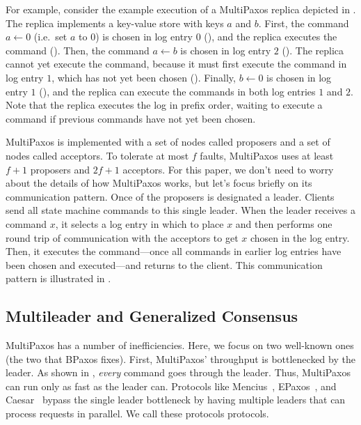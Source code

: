 For example, consider the example execution of a MultiPaxos replica depicted in
. The replica implements a key-value store
with keys $a$ and $b$. First, the command $a \gets 0$ (i.e.\ set $a$ to $0$) is
chosen in log entry $0$ (), and the replica
executes the command (). Then, the command
$a \gets b$ is chosen in log entry $2$ ().
The replica cannot yet execute the command, because it must first execute the
command in log entry $1$, which has not yet been chosen
().  Finally, $b \gets 0$ is chosen in log
entry $1$ (), and the replica can execute
the commands in both log entries $1$ and $2$. Note that the replica executes
the log in prefix order, waiting to execute a command if previous commands have
not yet been chosen.

{}

MultiPaxos is implemented with a set of nodes called proposers and a set of
nodes called acceptors. To tolerate at most $f$ faults, MultiPaxos uses at
least $f+1$ proposers and $2f+1$ acceptors. For this paper, we don't need to
worry about the details of how MultiPaxos works, but let's focus briefly on its
communication pattern. Once of the proposers is designated a leader. Clients
send all state machine commands to this single leader. When the leader receives
a command $x$, it selects a log entry in which to place $x$ and then performs
one round trip of communication with the acceptors to get $x$ chosen in the log
entry. Then, it executes the command---once all commands in earlier log entries
have been chosen and executed---and returns to the client.  This communication
pattern is illustrated in .

{}

\subsection{Multileader and Generalized Consensus}
MultiPaxos has a number of inefficiencies. Here, we focus on two well-known
ones (the two that BPaxos fixes). First, MultiPaxos' throughput is bottlenecked
by the leader. As shown in , \emph{every}
command goes through the leader. Thus, MultiPaxos can run only as fast as the
leader can. Protocols like Mencius~\cite{mao2008mencius},
EPaxos~\cite{moraru2013there}, and Caesar~\cite{arun2017speeding} bypass the
single leader bottleneck by having multiple leaders that can process requests
in parallel. We call these protocols  protocols.

